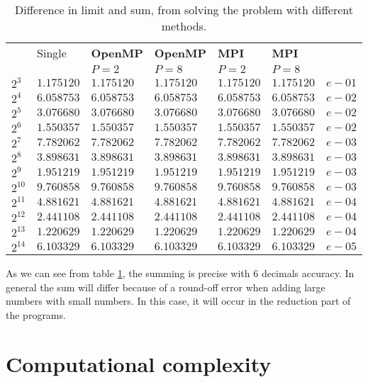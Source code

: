 \begin{table}[h!]
\begin{tabular}{l| l l l l l l}
 & Single & \textbf{OpenMP}& \textbf{OpenMP}& \textbf{MPI}& \textbf{MPI}\\
 & 		  & $P = 2$ & $P = 8$ & $P = 2$ & $P = 8$ \\
\hline
$2^3$   &$1.175120$&$1.175120$&$1.175120$&$1.175120$&$1.175120$& $e-01$\\ 
$2^4$   &$6.058753$&$6.058753$&$6.058753$&$6.058753$&$6.058753$& $e-02$\\
$2^5$   &$3.076680$&$3.076680$&$3.076680$&$3.076680$&$3.076680$& $e-02$\\
$2^6$   &$1.550357$&$1.550357$&$1.550357$&$1.550357$&$1.550357$& $e-02$\\
$2^7$   &$7.782062$&$7.782062$&$7.782062$&$7.782062$&$7.782062$& $e-03$\\
$2^8$   &$3.898631$&$3.898631$&$3.898631$&$3.898631$&$3.898631$& $e-03$\\
$2^9$   &$1.951219$&$1.951219$&$1.951219$&$1.951219$&$1.951219$& $e-03$\\
$2^{10}$&$9.760858$&$9.760858$&$9.760858$&$9.760858$&$9.760858$& $e-03$\\
$2^{11}$&$4.881621$&$4.881621$&$4.881621$&$4.881621$&$4.881621$& $e-04$\\
$2^{12}$&$2.441108$&$2.441108$&$2.441108$&$2.441108$&$2.441108$& $e-04$\\
$2^{13}$&$1.220629$&$1.220629$&$1.220629$&$1.220629$&$1.220629$& $e-04$\\
$2^{14}$&$6.103329$&$6.103329$&$6.103329$&$6.103329$&$6.103329$& $e-05$\\ 

\end{tabular} \caption{Difference in limit and sum, from solving the problem with different methods.}  \label{singledata}
\end{table}

As we can see from table \ref{singledata}, the summing is precise with 6 decimals accuracy. In general the sum will differ because of a round-off error when adding large numbers with small numbers. In this case, it will occur in the reduction part of the programs.

\section{Computational complexity}

